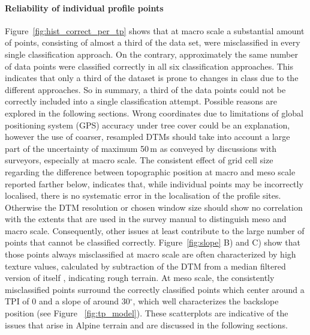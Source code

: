 \documentclass[preprint,12pt,authoryear]{elsarticle}
\begin{document}
\paragraph{Reliability of individual profile points} 
Figure~\ref{fig:hist_correct_per_tp} shows that at macro scale a substantial amount of points, consisting of almost a third of the data set, were misclassified in every single classification approach. On the contrary, approximately the same number of data points were classified correctly in all six classification approaches. This indicates that only a third of the dataset is prone to changes in class due to the different approaches. So in summary, a third of the data points could not be correctly included into a single classification attempt. Possible reasons are explored in the following sections. Wrong coordinates due to limitations of global positioning system (GPS) accuracy under tree cover could be an explanation, however the use of coarser, resampled DTMs should take into account a large part of the uncertainty of maximum 50\,m as conveyed by discussions with surveyors, especially at macro scale. The consistent effect of grid cell size regarding the difference between topographic position at macro and meso scale reported farther below, indicates that, while individual points may be incorrectly localised, there is no systematic error in the localisation of the profile sites. Otherwise the DTM resolution or chosen window size should show no correlation with the extents that are used in the survey manual to distinguish meso and macro scale. Consequently, other issues at least contribute to the large number of points that cannot be classified correctly. Figure~\ref{fig:slope} B) and C) show that those points always misclassified at macro scale are often characterized by high texture values, calculated by subtraction of the DTM from a median filtered version of itself \citep{Iwahashi2007}, indicating rough terrain. At meso scale, the consistently misclassified points surround the correctly classified points which center around a TPI of 0 and a slope of around 30$^{\circ}$, which well characterizes the backslope position (see Figure~ \ref{fig:tp_model}). These scatterplots are indicative of the issues that arise in Alpine terrain and are discussed in the following sections.
\end{document}
